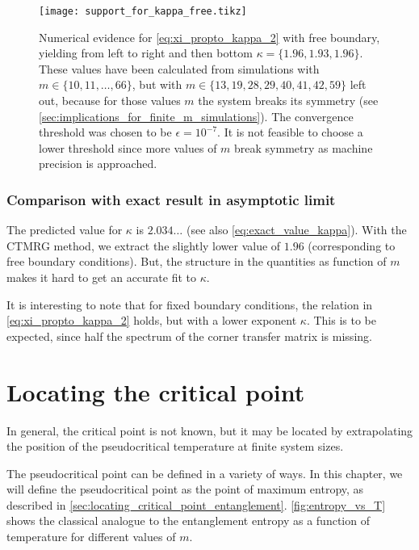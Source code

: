 \begin{figure}
  \texttt{[image: support\_for\_kappa\_free.tikz]}
  \caption{Numerical evidence for
\autoref{eq:xi_propto_kappa_2} with free boundary, yielding from left to right and then bottom $\kappa = \{ 1.96,
1.93, 1.96 \}$.
These values have been calculated from simulations with $m \in \{10,
11, \dots, 66 \}$, but with $m \in \{13, 19, 28, 29, 40, 41, 42,
59 \}$ left out, because for those values $m$ the system breaks its symmetry (see
\autoref{sec:implications_for_finite_m_simulations}).
The convergence threshold was chosen to be $\epsilon = 10^{-7}$.
It is not feasible to choose a lower threshold since more values of $m$ break symmetry as machine precision is
approached.}
\label{fig:support_for_kappa_free}
\end{figure}

\subsubsection{Comparison with exact result in asymptotic limit}

The predicted value for $\kappa$ \cite{pollmann2009theory} is $2.034\dots$ (see also \autoref{eq:exact_value_kappa}).
With the CTMRG method, we extract the slightly lower value of $1.96$ (corresponding to free boundary conditions).
But, the structure in the quantities as function of $m$ makes it hard to get an accurate fit to $\kappa$.

It is interesting to note that for fixed boundary conditions, the relation in \autoref{eq:xi_propto_kappa_2} holds,
but with a lower exponent $\kappa$.
This is to be expected, since half the spectrum of the corner transfer matrix is missing.

\section{Locating the critical point}\label{sec:locating_the_critical_point}

In general, the critical point is not known, but it may be located by extrapolating the position of the pseudocritical temperature at finite system sizes.

The pseudocritical point can be defined in a variety of ways.
In this chapter, we will define the pseudocritical point as the point of maximum entropy,
as described in \autoref{sec:locating_critical_point_entanglement}.
\autoref{fig:entropy_vs_T} shows the classical analogue to the entanglement entropy as a function of temperature for
different values of $m$.

